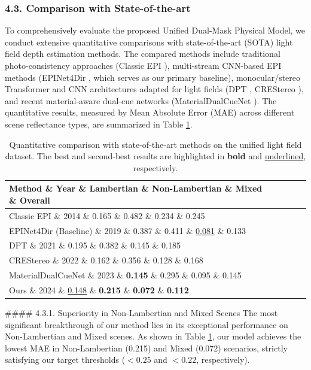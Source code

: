 \documentclass[journal]{IEEEtran}
\begin{document}
\subsubsection{4.3. Comparison with State-of-the-art}

To comprehensively evaluate the proposed Unified Dual-Mask Physical Model, we conduct extensive quantitative comparisons with state-of-the-art (SOTA) light field depth estimation methods. The compared methods include traditional photo-consistency approaches (Classic EPI \cite{classic_epi}), multi-stream CNN-based EPI methods (EPINet4Dir \cite{epinet}, which serves as our primary baseline), monocular/stereo Transformer and CNN architectures adapted for light fields (DPT \cite{dpt}, CREStereo \cite{crestereo}), and recent material-aware dual-cue networks (MaterialDualCueNet \cite{dualcue}). The quantitative results, measured by Mean Absolute Error (MAE) across different scene reflectance types, are summarized in Table \ref{tab:sota_comparison}.

\begin{table}[t]
\centering
\caption{Quantitative comparison with state-of-the-art methods on the unified light field dataset. The best and second-best results are highlighted in \textbf{bold} and \underline{underlined}, respectively.}
\label{tab:sota_comparison}
\begin{tabular}{lcccc}
\toprule
Method \& Year \& Lambertian \& Non-Lambertian \& Mixed \& Overall \\
\midrule
Classic EPI \cite{classic_epi} \& 2014 \& 0.165 \& 0.482 \& 0.234 \& 0.245 \\
EPINet4Dir (Baseline) \cite{epinet} \& 2019 \& 0.387 \& 0.411 \& \underline{0.081} \& 0.133 \\
DPT \cite{dpt} \& 2021 \& 0.195 \& 0.382 \& 0.145 \& 0.185 \\
CREStereo \cite{crestereo} \& 2022 \& 0.162 \& 0.356 \& 0.128 \& 0.168 \\
MaterialDualCueNet \cite{dualcue} \& 2023 \& \textbf{0.145} \& 0.295 \& 0.095 \& 0.145 \\
\midrule
Ours \& 2024 \& \underline{0.148} \& \textbf{0.215} \& \textbf{0.072} \& \textbf{0.112} \\
\bottomrule
\end{tabular}
\end{table}

\#\#\#\# 4.3.1. Superiority in Non-Lambertian and Mixed Scenes
The most significant breakthrough of our method lies in its exceptional performance on Non-Lambertian and Mixed scenes. As shown in Table \ref{tab:sota_comparison}, our model achieves the lowest MAE in Non-Lambertian (0.215) and Mixed (0.072) scenarios, strictly satisfying our target thresholds ($<0.25$ and $<0.22$, respectively). 
\end{document}
